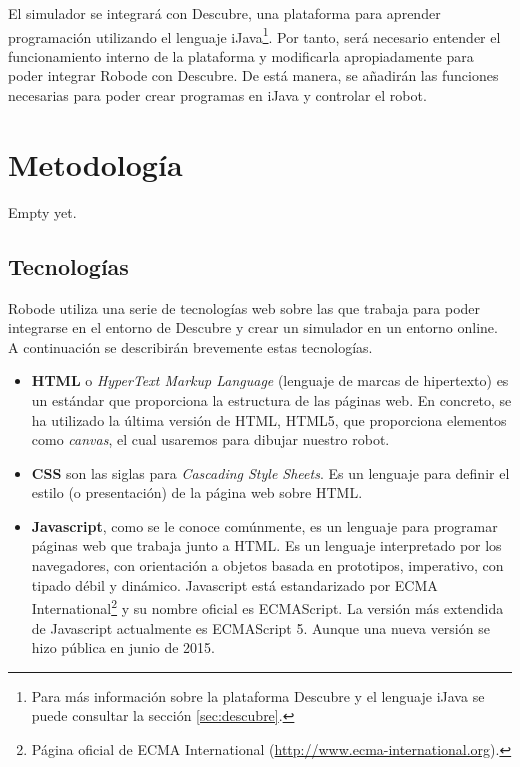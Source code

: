 El simulador se integrará con Descubre, una plataforma para aprender programación utilizando el lenguaje iJava\footnote{Para más información sobre la plataforma Descubre y el lenguaje iJava se puede consultar la sección \ref{sec:descubre}.}. Por tanto, será necesario entender el funcionamiento interno de la plataforma y modificarla apropiadamente para poder integrar Robode con Descubre. De está manera, se añadirán las funciones necesarias para poder crear programas en iJava y controlar el robot.


\section{{\color{green}Metodología}}
\label{sec:metodologia}


{\color{green}
Empty yet.
}


\subsection{Tecnologías}
\label{sec:tecnologias}


Robode utiliza una serie de tecnologías web sobre las que trabaja para poder integrarse en el entorno de Descubre y crear un simulador en un entorno online. A continuación se describirán brevemente estas tecnologías.

\begin{itemize}
	
	\item \textbf{HTML} o \emph{HyperText Markup Language} (lenguaje de marcas de hipertexto)	es un estándar que proporciona la estructura de las páginas web. En concreto, se ha utilizado la última versión de HTML, HTML5, que proporciona elementos como \emph{canvas}, el cual usaremos para dibujar nuestro robot.
	
	\item \textbf{CSS} son las siglas para \emph{Cascading Style Sheets}. Es un lenguaje para definir el estilo (o presentación) de la página web sobre HTML.
	
	\item \textbf{Javascript}, como se le conoce comúnmente, es un lenguaje para programar páginas web que trabaja junto a HTML. Es un lenguaje interpretado por los navegadores, con orientación a objetos basada en prototipos, imperativo, con tipado débil y dinámico. Javascript está estandarizado por ECMA International\footnote{Página oficial de ECMA International (\url{http://www.ecma-international.org}).} y su nombre oficial es ECMAScript. La versión más extendida de Javascript actualmente es ECMAScript 5. Aunque una nueva versión se hizo pública en junio de 2015\cite{ecmascript6}. 
	
\end{itemize}



